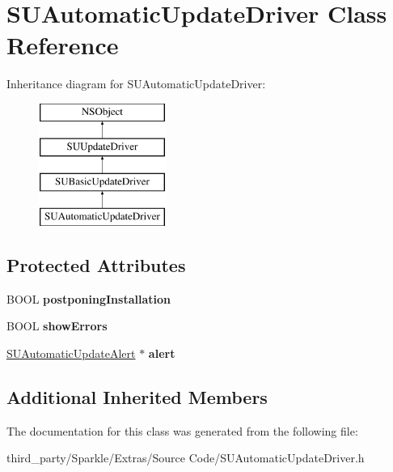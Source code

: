 \hypertarget{interface_s_u_automatic_update_driver}{}\section{S\+U\+Automatic\+Update\+Driver Class Reference}
\label{interface_s_u_automatic_update_driver}
Inheritance diagram for S\+U\+Automatic\+Update\+Driver\+:\begin{figure}[H]
\begin{center}
\leavevmode
\includegraphics[height=4.000000cm]{interface_s_u_automatic_update_driver}
\end{center}
\end{figure}
\subsection*{Protected Attributes}
\begin{DoxyCompactItemize}
\item 
\mbox{\label{interface_s_u_automatic_update_driver_aa3055d05955d0718af70d00bb8b64b60}} 
B\+O\+OL {\bfseries postponing\+Installation}
\item 
\mbox{\label{interface_s_u_automatic_update_driver_a6a682ebcd13a2630cac24e469994e40c}} 
B\+O\+OL {\bfseries show\+Errors}
\item 
\mbox{\label{interface_s_u_automatic_update_driver_a5d9421404e69df9b43318ffb875a1089}} 
\mbox{\hyperlink{interface_s_u_automatic_update_alert}{S\+U\+Automatic\+Update\+Alert}} $\ast$ {\bfseries alert}
\end{DoxyCompactItemize}
\subsection*{Additional Inherited Members}


The documentation for this class was generated from the following file\+:\begin{DoxyCompactItemize}
\item 
third\+\_\+party/\+Sparkle/\+Extras/\+Source Code/S\+U\+Automatic\+Update\+Driver.\+h\end{DoxyCompactItemize}
